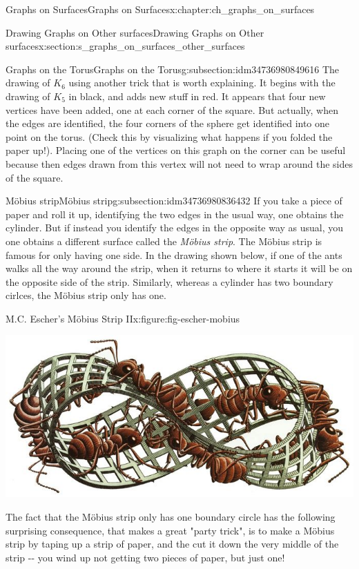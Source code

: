 \documentclass[oneside,10pt,]{book}
\numberwithin{equation}{section}
\begin{document}
\begin{chapterptx}{Graphs on Surfaces}{}{Graphs on Surfaces}{}{}{x:chapter:ch_graphs_on_surfaces}
\begin{sectionptx}{Drawing Graphs on Other surfaces}{}{Drawing Graphs on Other surfaces}{}{}{x:section:s_graphs_on_surfaces_other_surfaces}
\begin{subsectionptx}{Graphs on the Torus}{}{Graphs on the Torus}{}{}{g:subsection:idm34736980849616}
The drawing of \(K_6\) using another trick that is worth explaining.  It begins with the drawing of \(K_5\) in black, and adds new stuff in red.  It appears that four new vertices have been added, one at each corner of the square.  But actually, when the edges are identified, the four corners of the sphere get identified into one point on the torus.  (Check this by visualizing what happens if you folded the paper up!).  Placing one of the vertices on this graph on the corner can be useful because then edges drawn from this vertex will not need to wrap around the sides of the square.%
\end{subsectionptx}
%
%
\typeout{************************************************}
\typeout{************************************************}
%
\begin{subsectionptx}{Möbius strip}{}{Möbius strip}{}{}{g:subsection:idm34736980836432}
If you take a piece of paper and roll it up, identifying the two edges in the usual way, one obtains the cylinder.  But if instead you identify the edges in the opposite way as usual, you one obtains a different surface called the \emph{Möbius strip}.  The Möbius strip is famous for only having one side.  In the drawing shown below, if one of the ants walks all the way around the strip, when it returns to where it starts it will be on the opposite side of the strip.  Similarly, whereas a cylinder has two boundary cirlces, the Möbius strip only has one.%
\begin{figureptx}{M.C. Escher's Möbius Strip II}{x:figure:fig-escher-mobius}{}%
\begin{image}{0.05}{0.9}{0.05}%
\includegraphics[width=\linewidth]{images/EscherMobius.jpg}
\end{image}%
\tcblower
\end{figureptx}%
The fact that the Möbius strip only has one boundary circle has the following surprising consequence, that makes a great "party trick", is to make a Möbius strip by taping up a strip of paper, and the cut it down the very middle of the strip -{}-{} you wind up not getting two pieces of paper, but just one!%

\end{subsectionptx}
\end{sectionptx}
\end{chapterptx}
\end{document}
